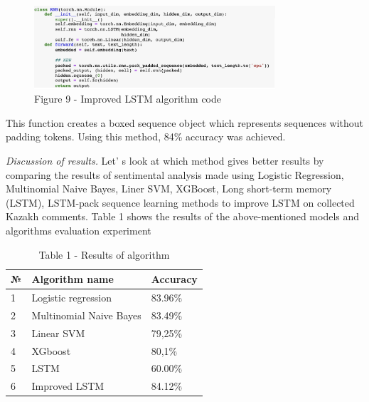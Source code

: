 \begin{figure}[H]
	\centering
	\includegraphics[width=0.8\textwidth]{media/ict/image16}
	\caption*{Figure 9 - Improved LSTM algorithm code}
\end{figure}

This function creates a boxed sequence object which represents sequences
without padding tokens. Using this method, 84\% accuracy was achieved.

\emph{Discussion of results.} Let' s look at which method
gives better results by comparing the results of sentimental analysis
made using Logistic Regression, Multinomial Naive Bayes, Liner SVM,
XGBoost, Long short-term memory (LSTM), LSTM-pack sequence learning
methods to improve LSTM on collected Kazakh comments. Table 1 shows the
results of the above-mentioned models and algorithms evaluation
experiment

\begin{table}[H]
\caption*{Table 1 - Results of algorithm}
\centering
\begin{tabular}{|l|l|l|}
\hline
№ & Algorithm name              & Accuracy \\ \hline
1 & Logistic regression         & 83.96\%  \\ \hline
2 & Multinomial Naive Bayes     & 83.49\%  \\ \hline
3 & Linear SVM                  & 79,25\%  \\ \hline
4 & XGboost                     & 80,1\%   \\ \hline
5 & LSTM                        & 60.00\%  \\ \hline
6 & Improved LSTM               & 84.12\%  \\ \hline
\end{tabular}
\end{table}

